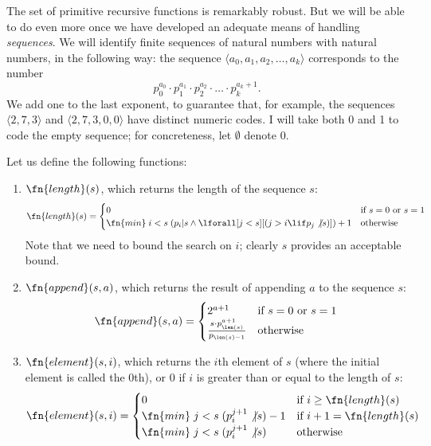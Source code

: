 \documentclass[../../include/open-logic-section]{subfiles}
\begin{document}

The set of primitive recursive functions is
remarkably robust. But we will be able to do even more once we have
developed an adequate means of handling \emph{sequences}.  We will
identify finite sequences of natural numbers with natural numbers, in
the following way: the sequence $\langle a_0, a_1, a_2, \dots, a_k \rangle$
corresponds to the number
\[
p_0^{a_0} \cdot p_1^{a_1} \cdot p_2^{a_2} \cdot \dots \cdot
p_k^{a_k+1}.
\]
We add one to the last exponent, to guarantee that, for example,
the sequences $\langle 2, 7, 3\rangle$ and $\langle 2, 7, 3, 0, 0 \rangle$ have
distinct numeric codes. I will take both 0 and 1 to code the empty
sequence; for concreteness, let $\emptyset$ denote $0$.

Let us define the following functions:
\begin{enumerate}
\item $\fn{length}(s)$, which returns the length of the sequence $s$:
\[
\fn{length}(s) = 
\begin{cases} 
0 & \text{if $s = 0$ or $s = 1$} \\
\fn{min} \; i < s \; (p_i | s \land \lforall[j < s][(j > i \lif
    p_j \not | s)])+1 & \text{otherwise}
\end{cases}
\]
Note that we need to bound the search on $i$; clearly $s$ provides an
acceptable bound.

\item $\fn{append}(s,a)$, which returns the result of appending $a$ to
  the sequence $s$:
\[
\fn{append}(s,a) = 
\begin{cases}
  2^{a+1} & \text{if $s = 0$ or $s = 1$} \\
\frac{s \cdot p_{\len(s)}^{a+1}}{p_{\len(s)-1}} & \text{otherwise}
\end{cases}
\]
\item $\fn{element}(s,i)$, which returns the $i$th element of $s$
  (where the initial element is called the $0$th), or $0$ if $i$ is
  greater than or equal to the length of $s$:
\[
\fn{element}(s,i) = 
\begin{cases}
  0 & \mbox{if $i \geq \fn{length}(s)$} \\
  \fn{min} \; {j < s} \; (p_i^{j+1} \not | s)-1  & \text{if $i+1 = 
    \fn{length}(s)$} \\
  \fn{min} \; {j < s} \; (p_i^{j+1} \not | s)  & \text{otherwise}
\end{cases}
\]
\end{enumerate}
\end{document}
